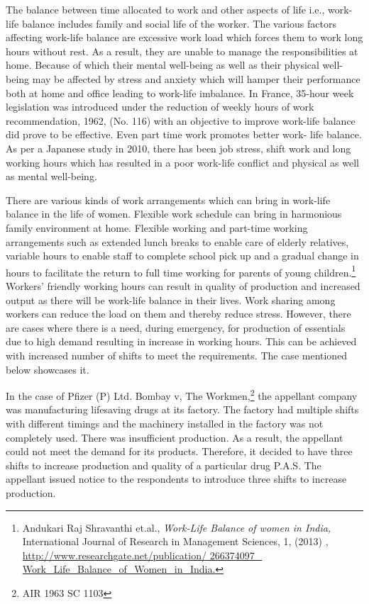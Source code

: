 \begin{multicols}{2}
\noi
The balance between time allocated to work and other aspects of life i.e., work-life balance
includes family and social life of the worker. The various factors affecting work-life balance
are excessive work load which forces them to work long hours without rest. As a result, they
are unable to manage the responsibilities at home. Because of which their mental well-being
as well as their physical well-being may be affected by stress and anxiety which will hamper
their performance both at home and office leading to work-life imbalance. In France, 35-hour
week legislation was introduced under the reduction of weekly hours of work
recommendation, 1962, (No. 116) with an objective to improve work-life balance did prove
to be effective. Even part time work promotes better work- life balance. As per a Japanese
study in 2010, there has been job stress, shift work and long working hours which has
resulted in a poor work-life conflict and physical as well as mental well-being.

\noi
There are various kinds of work arrangements which can bring in work-life balance in the life
of women. Flexible work schedule can bring in harmonious family environment at home.
Flexible working and part-time working arrangements such as extended lunch breaks to
enable care of elderly relatives, variable hours to enable staff to complete school pick up and
a gradual change in hours to facilitate the return to full time working for parents of young
children.\footnote{Andukari Raj Shravanthi et.al., \textit{Work-Life Balance of women in India,} International Journal of Research in
Management Sciences, 1, (2013) , \url{http://www.researchgate.net/publication/ 266374097_
Work_Life_Balance_of_Women_in_India.}} Workers’ friendly working hours can result in quality of production and increased
output as there will be work-life balance in their lives. Work sharing among workers can
reduce the load on them and thereby reduce stress. However, there are cases where there is a
need, during emergency, for production of essentials due to high demand resulting in increase
in working hours. This can be achieved with increased number of shifts to meet the
requirements. The case mentioned below showcases it.

\noi
In the case of Pfizer (P) Ltd. Bombay v, The Workmen,\footnote{AIR 1963 SC 1103} the appellant company was
manufacturing lifesaving drugs at its factory. The factory had multiple shifts with different
timings and the machinery installed in the factory was not completely used. There was
insufficient production. As a result, the appellant could not meet the demand for its products.
Therefore, it decided to have three shifts to increase production and quality of a particular 
drug P.A.S. The appellant issued notice to the respondents to introduce three shifts to
increase production.


\end{multicols}
